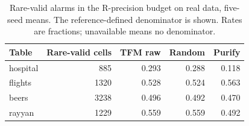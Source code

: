 \begin{table}[t]
\centering\small
\setlength{\tabcolsep}{3.5pt}
\caption{Rare-valid alarms in the R-precision budget on real data, five-seed means. The reference-defined denominator is shown. Rates are fractions; unavailable means no denominator.}
\label{tab:rare}
\begin{tabular}{lrrrr}
\toprule
Table & Rare-valid cells & TFM raw & Random & Purify \\
\midrule
hospital & 885 & 0.293 & 0.288 & 0.118 \\
flights & 1320 & 0.528 & 0.524 & 0.563 \\
beers & 3238 & 0.496 & 0.492 & 0.470 \\
rayyan & 1229 & 0.559 & 0.559 & 0.492 \\
\bottomrule
\end{tabular}
\end{table}
